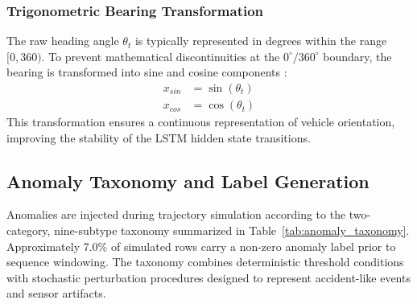 \documentclass[journal]{IEEEtran}
\begin{document}
\begin{table}[!htbp]
  \centering
  \caption{Summary of data-cleaning filters}
  \label{tab:cleaning_summary}
  \renewcommand{\arraystretch}{1.15}
\end{table}

\subsubsection{Trigonometric Bearing Transformation}
The raw heading angle $\theta_t$ is typically represented in degrees within the range $[0, 360)$. To prevent mathematical discontinuities at the $0^\circ/360^\circ$ boundary, the bearing is transformed into sine and cosine components \cite{taheri_sarteshnizi_applicability_2026}:
\begin{align}
  x_{sin} &= \sin(\theta_t) \\
  x_{cos} &= \cos(\theta_t)
\end{align}
This transformation ensures a continuous representation of vehicle orientation, improving the stability of the LSTM hidden state transitions.

\subsection{Anomaly Taxonomy and Label Generation}
Anomalies are injected during trajectory simulation according to the two-category, nine-subtype taxonomy summarized in Table~\ref{tab:anomaly_taxonomy}. Approximately 7.0\% of simulated rows carry a non-zero anomaly label prior to sequence windowing. The taxonomy combines deterministic threshold conditions with stochastic perturbation procedures designed to represent accident-like events and sensor artifacts.
\end{document}
